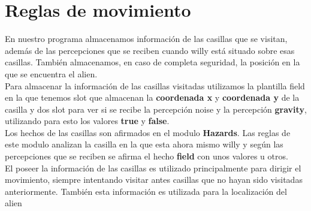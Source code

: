 \documentclass[a4paper,10pt]{article}
\begin{document}
\section{Reglas de movimiento}
En nuestro programa almacenamos información de las casillas que se visitan, además de las percepciones que se reciben cuando willy está situado sobre esas casillas. También almacenamos, en caso de completa seguridad, la posición en la que se encuentra el alien.
\vspace{0.5 cm}\\
Para almacenar la información de las casillas visitadas utilizamos la plantilla field en la que tenemos slot que almacenan la {\bf coordenada x} y {\bf coordenada y}  de la casilla y dos slot para ver si se recibe la percepción noise y la percepción {\bf gravity}, utilizando para esto los valores {\bf true} y {\bf false}.
\vspace{0.5 cm}\\
Los hechos de las casillas son afirmados en el modulo {\bf Hazards}. Las reglas de este modulo analizan la casilla en la que esta ahora mismo willy y según las percepciones que se reciben se afirma el hecho {\bf field} con unos valores u otros.
\vspace{0.5 cm}\\
El poseer la información de las casillas es utilizado principalmente para dirigir el movimiento, siempre intentando visitar antes casillas que no hayan sido visitadas anteriormente. También esta información es utilizada para la localización del alien
\end{document}
